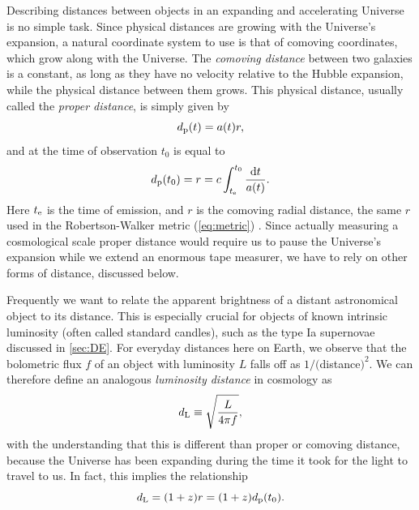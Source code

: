 Describing distances between objects in an expanding and accelerating Universe is no simple task. Since physical distances are growing with the Universe's expansion, a natural coordinate system to use is that of comoving coordinates, which grow along with the Universe. The {\it comoving distance} between two galaxies is a constant, as long as they have no velocity relative to the Hubble expansion, while the physical distance between them grows. This physical distance, usually called the {\it proper distance}, is simply given by
\begin{equation}
d_{\rm p}(t) = a(t) r,
\end{equation}
and at the time of observation $t_0$ is equal to
\begin{equation}
d_{\rm p}(t_0) = r = c \int_{t_{\rm e}}^{t_0} \frac{{\rm d}t}{a(t)}.
\end{equation}
Here $t_{\rm e}$ is the time of emission, and $r$ is the comoving radial distance, the same $r$ used in the Robertson-Walker metric (\autoref{eq:metric}) \citep{RydenText}. Since actually measuring a cosmological scale proper distance would require us to pause the Universe's expansion while we extend an enormous tape measurer, we have to rely on other forms of distance, discussed below. 

Frequently we want to relate the apparent brightness of a distant astronomical object to its distance. This is especially crucial for objects of known intrinsic luminosity (often called standard candles), such as the type Ia supernovae discussed in \autoref{sec:DE}. For everyday distances here on Earth, we observe that the bolometric flux $f$ of an object with luminosity $L$ falls off as $1/($distance$)^2$. We can therefore define an analogous {\it luminosity distance} in cosmology as
\begin{equation}
\label{eqn:dL}
d_{\rm L} \equiv \sqrt{\frac{L}{4\pi f}},
\end{equation}
with the understanding that this is different than proper or comoving distance, because the Universe has been expanding during the time it took for the light to travel to us. In fact, this implies the relationship
\begin{equation}
d_{\rm L} = (1+z)r = (1+z)d_{\rm p}(t_0).
\end{equation}

